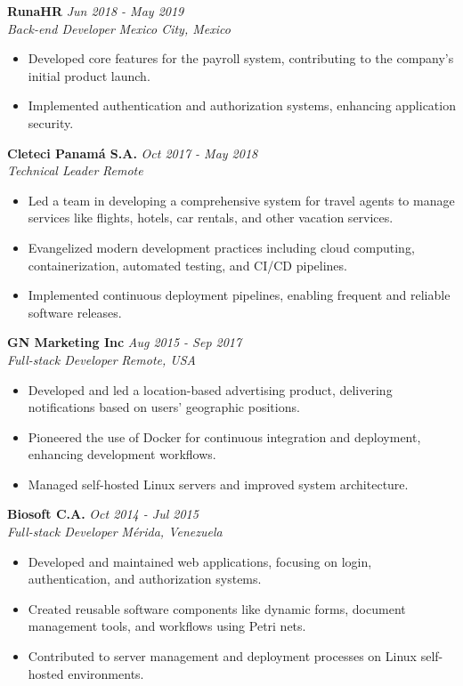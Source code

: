 \documentclass[a4paper,10pt]{article}
\begin{document}
\textbf{RunaHR} \hfill \textit{Jun 2018 - May 2019} \\
\textit{Back-end Developer} \hfill \textit{Mexico City, Mexico} \\
\begin{itemize}[leftmargin=0.5cm, topsep=0pt, parsep=0pt, itemsep=2pt]
    \item Developed core features for the payroll system, contributing to the company’s initial product launch.
    \item Implemented authentication and authorization systems, enhancing application security.
\end{itemize}

\textbf{Cleteci Panamá S.A.} \hfill \textit{Oct 2017 - May 2018} \\
\textit{Technical Leader} \hfill \textit{Remote} \\
\begin{itemize}[leftmargin=0.5cm, topsep=0pt, parsep=0pt, itemsep=2pt]
    \item Led a team in developing a comprehensive system for travel agents to manage services like flights, hotels, car rentals, and other vacation services.
    \item Evangelized modern development practices including cloud computing, containerization, automated testing, and CI/CD pipelines.
    \item Implemented continuous deployment pipelines, enabling frequent and reliable software releases.
\end{itemize}

\textbf{GN Marketing Inc} \hfill \textit{Aug 2015 - Sep 2017} \\
\textit{Full-stack Developer} \hfill \textit{Remote, USA} \\
\begin{itemize}[leftmargin=0.5cm, topsep=0pt, parsep=0pt, itemsep=2pt]
    \item Developed and led a location-based advertising product, delivering notifications based on users’ geographic positions.
    \item Pioneered the use of Docker for continuous integration and deployment, enhancing development workflows.
    \item Managed self-hosted Linux servers and improved system architecture.
\end{itemize}

\textbf{Biosoft C.A.} \hfill \textit{Oct 2014 - Jul 2015} \\
\textit{Full-stack Developer} \hfill \textit{Mérida, Venezuela} \\
\begin{itemize}[leftmargin=0.5cm, topsep=0pt, parsep=0pt, itemsep=2pt]
    \item Developed and maintained web applications, focusing on login, authentication, and authorization systems.
    \item Created reusable software components like dynamic forms, document management tools, and workflows using Petri nets.
    \item Contributed to server management and deployment processes on Linux self-hosted environments.
\end{itemize}
\end{document}
